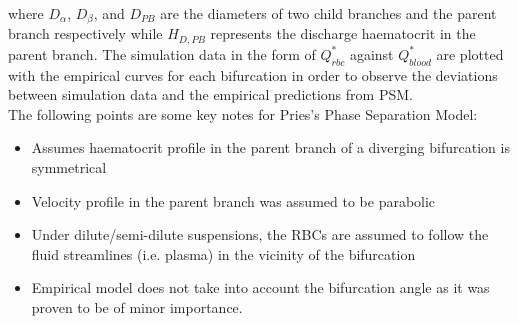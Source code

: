 \bigskip

\noindent where $D_{\alpha}$, $D_{\beta}$, and $D_{PB}$ are the diameters of two child branches and the parent branch respectively while $H_{D,PB}$ represents the discharge haematocrit in the parent branch. The simulation data in the form of $Q^{*}_{rbc}$ against $Q^{*}_{blood}$ are plotted with the empirical curves for each bifurcation in order to observe the deviations between simulation data and the empirical predictions from PSM. \\

\noindent The following points are some key notes for Pries's Phase Separation Model:\cite{A.R.Pries2005Mbvi, PriesAR1990BFiM, PRIES198981}
\begin{itemize}
    \item Assumes haematocrit profile in the parent branch of a diverging bifurcation is symmetrical
    \item Velocity profile in the parent branch was assumed to be parabolic
    \item Under dilute/semi-dilute suspensions, the RBCs are assumed to follow the fluid streamlines (i.e. plasma) in the vicinity of the bifurcation
    \item Empirical model does not take into account the bifurcation angle as it was proven to be of minor importance. 
\end{itemize}

